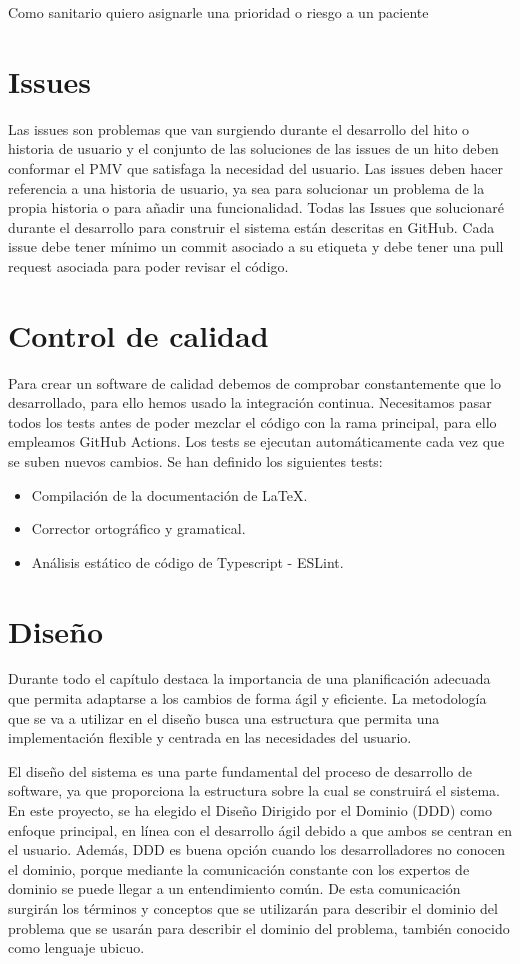 Como sanitario quiero asignarle una prioridad o riesgo a un paciente

\section{Issues}
Las issues son problemas que van surgiendo durante el desarrollo del hito o historia de usuario y
el conjunto de las soluciones de las issues de un hito deben conformar el PMV que satisfaga la necesidad del usuario.
Las issues deben hacer referencia a una historia de usuario, ya sea para solucionar un problema de la propia historia o para añadir una funcionalidad.
Todas las Issues que solucionaré durante el desarrollo para construir el sistema están descritas en GitHub. Cada issue debe tener mínimo un commit asociado a su
etiqueta y debe tener una pull request asociada para poder revisar el código.

\section{Control de calidad}
Para crear un software de calidad debemos de comprobar constantemente que lo desarrollado, para ello hemos usado la integración continua.
Necesitamos pasar todos los tests antes de poder mezclar el código con la rama principal, para ello empleamos GitHub Actions.
Los tests se ejecutan automáticamente cada vez que se suben nuevos cambios. Se han definido los siguientes tests:

\begin{itemize}
    \item{Compilación de la documentación de LaTeX.}
    \item{Corrector ortográfico y gramatical.}
    \item{Análisis estático de código de Typescript - ESLint.}
\end{itemize}

\section{Diseño}
Durante todo el capítulo destaca la importancia de una planificación adecuada que permita adaptarse a los cambios de forma ágil y eficiente.
La metodología que se va a utilizar en el diseño busca una estructura que permita una implementación flexible y centrada en las necesidades del usuario.

El diseño del sistema es una parte fundamental del proceso de desarrollo de software, ya que proporciona la estructura sobre la cual se construirá el sistema.
En este proyecto, se ha elegido el Diseño Dirigido por el Dominio (DDD) \cite{domain-drive-design} como enfoque principal, en línea con el desarrollo ágil debido a que ambos se centran en el usuario.
Además, DDD es buena opción cuando los desarrolladores no conocen el dominio, porque mediante la comunicación constante con los expertos de dominio se puede llegar a un entendimiento común.
De esta comunicación surgirán los términos y conceptos que se utilizarán para describir el dominio del problema que se usarán para describir el dominio del problema, también conocido como lenguaje ubicuo.

